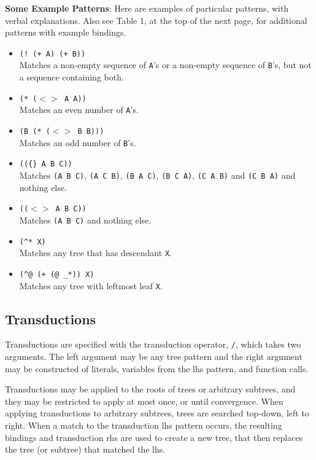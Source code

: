 \documentclass[a4,11pt]{article}
\begin{document}
{\bf Some Example Patterns}:
Here are examples of particular patterns, with verbal explanations.   Also see Table 1, at the top of the next page, for additional patterns with example bindings.
  \begin{itemize}
  \item \texttt{(! (+ A) (+ B))}\\Matches a non-empty sequence of \texttt{A}'s or a non-empty sequence of \texttt{B}'s, but not a sequence containing both.
  \item \texttt{(* ($<>$ A A))}\\Matches an even number of \texttt{A}'s.
  \item \texttt{(B (* ($<>$ B B)))}\\Matches an odd number of \texttt{B}'s.
  \item \texttt{((\{\} A B C))}\\Matches \texttt{(A B C)}, \texttt{(A C B)}, \texttt{(B A C)}, \texttt{(B C A)}, \texttt{(C A B)} and \texttt{(C B A)} and nothing else.
  \item \texttt{(($<>$ A B C))}\\Matches \texttt{(A B C)} and nothing else.
  \item \texttt{(\^{}* X)}\\Matches any tree that has descendant \texttt{X}.
  \item \texttt{(\^{}@ (+ (@ \_*)) X)}\\Matches any tree with leftmost leaf \texttt{X}.
  \end{itemize}





\subsection*{Transductions}
Transductions are specified with the transduction operator, \texttt{/}, which takes two arguments.  The left argument may be any tree pattern and the right argument may be constructed of literals, variables from the lhs pattern, and function calls.

Transductions may be applied to the roots of trees or arbitrary subtrees, and they may be restricted to apply at most once, or until convergence.  When applying transductions to arbitrary subtrees, trees are searched top-down, left to right.  When a match to the transduction lhs pattern occurs, the resulting bindings and transduction rhs are used to create a new tree, that then replaces the tree (or subtree) that matched the lhs. 
\end{document}
